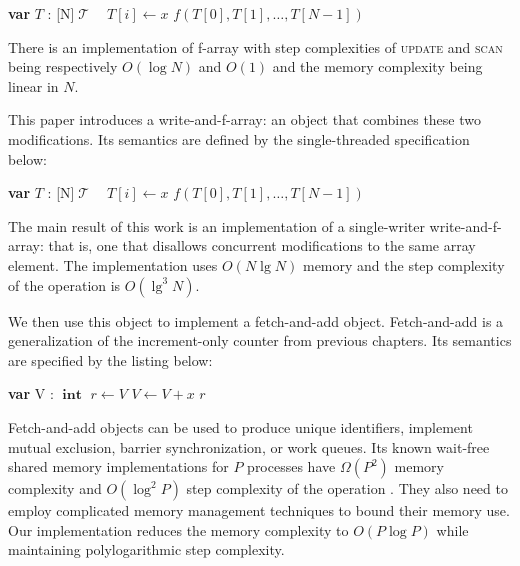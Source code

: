 \documentclass[a4paper,11pt]{article}
\def\T{\ensuremath{\operatorname{\mathcal{T}}}\text{ }}
\def\int{\ensuremath{\operatorname{\textbf{int}}}}
\newcommand{\fn}[1]{\textsc{#1}}
\newcommand{\var}[2]{\textbf{var }#1 : #2}
\newcommand{\arrayspec}[1]{\text{array}[#1]\text{ of }}
\begin{document}
\begin{algorithmic}[1]
	\State\var{$T$}{\arrayspec{N}$\T$}
	\State $T[i] \gets x$
\EndFunction
{}
	\State\Return $f(T[0], T[1], \ldots, T[N-1])$
\EndFunction
\end{algorithmic}

There is an implementation of f-array with step complexities of \fn{update} and \fn{scan} being respectively $O(\log N)$ and $O(1)$ and the memory complexity
being linear in $N$.

This paper introduces a write-and-f-array: an object that combines these two modifications. Its semantics are defined by the single-threaded specification below:

\begin{algorithmic}[1]
	\State\var{$T$}{\arrayspec{N}$\T$}
		\State $T[i] \gets x$
		\State\Return $f(T[0], T[1], \ldots, T[N-1])$
	\EndFunction
\end{algorithmic}

The main result of this work is an implementation of a single-writer
write-and-f-array: that is, one that disallows concurrent modifications to the same array element. The implementation
uses $O(N\lg{}N)$ memory and the step complexity of the operation is $O(\lg^3N)$. 

We then use this object to implement a fetch-and-add object. Fetch-and-add is a generalization of the increment-only counter from previous chapters. Its semantics are specified by the listing below:

\begin{algorithmic}[1]
\State\var{V}{\int}
	\State $r \gets V$
	\State $V \gets V + x$
	\State\Return $r$
\EndFunction
\end{algorithmic}


Fetch-and-add objects can be used to produce unique identifiers, implement
mutual exclusion, barrier synchronization\cite{faa-sync}, or work queues\cite{faa-queue}. Its known wait-free shared memory implementations for $P$ processes have $\Omega(P^2)$ memory complexity and $O(\log^2 P)$ step complexity
of the operation \cite{ellen-fai}\cite{closed-object}. They also need to employ complicated memory management techniques to bound their memory use. Our implementation reduces the memory complexity to $O(P\log P)$ while maintaining polylogarithmic step complexity.
\end{document}
